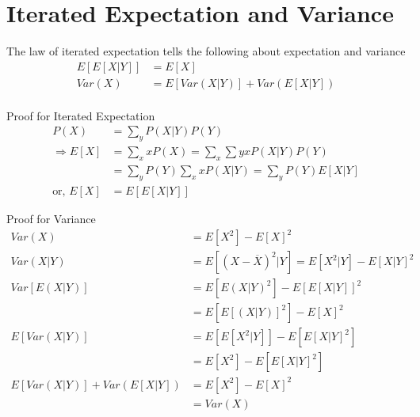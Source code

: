 \documentclass[../probability-notes.tex]{subfiles}
\begin{document}
    \chapter{Iterated Expectation and Variance}
    The law of iterated expectation tells the following about expectation and variance
    \begin{align*}
        E[E[X|Y]] &= E[X] \\
        Var(X) &= E[Var(X|Y)] + Var(E[X|Y])\\
    \end{align*}

    Proof for Iterated Expectation
    \begin{align*}
        P(X) &= \sum_{y} P(X|Y) P(Y) \\
        \Rightarrow E[X] &= \sum_{x} xP(X) = \sum_{x} \sum{y} xP(X|Y)P(Y) \\
            &= \sum_{y} P(Y) \sum_{x} xP(X|Y) = \sum_{y} P(Y) E[X|Y] \\
        \text{or, } E[X] &= E[E[X|Y]] \tag*{$E[X|Y]$ is a function of $X$ and not $Y$}
    \end{align*}
    
    Proof for Variance
    \begin{align*}
        Var(X) &= E[X^{2}] - E[X]^{2} \\
        Var(X|Y) &= E[(X-\overline{X})^{2}|Y] = E[X^{2}|Y] - E[X|Y]^{2} \tag*{1}\\
        Var[E(X|Y)] &= E[E(X|Y)^{2}] - E[E[X|Y]]^{2}\\
                    &= E[E[(X|Y)]^{2}] - E[X]^{2} \tag*{2}\\
        E[Var(X|Y)] &= E[E[X^{2}|Y]] - E[E[X|Y]^{2}] \tag*{from 1}\\
                    &= E[X^{2}] - E[E[X|Y]^{2}] \tag*{3}\\
        E[Var(X|Y)] + Var(E[X|Y]) &= E[X^{2}] - E[X]^{2} \tag*{adding 2 and 3}\\
                                    &= Var(X)
    \end{align*}
\end{document}
